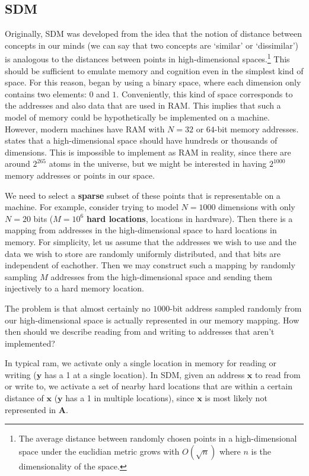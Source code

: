 \documentclass[journal, onecolumn, 12pt, draftclsnofoot]{IEEEtran}
\newcommand{\kword}[1]{\textbf{#1}}
\newcommand{\mbf}[1]{\mathbf{#1}}
\begin{document}
	\subsection{SDM}
	\par Originally, SDM was developed from the idea that the notion of distance between concepts in our minds (we can say that two concepts are `similar' or `dissimilar') is analogous to the distances between points in high-dimensional spaces.\footnote{The average distance between randomly chosen points in a high-dimensional space under the euclidian metric grows with $O(\sqrt{n})$ where $n$ is the dimensionality of the space.} This should be sufficient to emulate memory and cognition even in the simplest kind of space. For this reason, \cite{sdm} began by using a binary space, where each dimension only contains two elements: $0$ and $1$. Conveniently, this kind of space corresponds to the addresses and also data that are used in RAM. This implies that such a model of memory could be hypothetically be implemented on a machine. However, modern machines have RAM with $N = 32$ or $64$-bit memory addresses. \cite{sdm} states that a high-dimensional space should have hundreds or thousands of dimensions. This is impossible to implement as RAM in reality, since there are around $2^{265}$ atoms in the universe, but we might be interested in having $2^{1000}$ memory addresses or points in our space.
	\par We need to select a \kword{sparse} subset of these points that is representable on a machine. For example, consider trying to model $N = 1000$ dimensions with only $N=20$ bits ($M = 10^6$ \kword{hard locations}, locations in hardware). Then there is a mapping from addresses in the high-dimensional space to hard locations in memory. For simplicity, let us assume that the addresses we wish to use and the data we wish to store are randomly uniformly distributed, and that bits are independent of eachother. Then we may construct such a mapping by randomly sampling $M$ addresses from the high-dimensional space and sending them injectively to a hard memory location.
	\par The problem is that almost certainly no $1000$-bit address sampled randomly from our high-dimensional space is actually represented in our memory mapping. How then should we describe reading from and writing to addresses that aren't implemented?
	\par In typical ram, we activate only a single location in memory for reading or writing ($\mbf{y}$ has a 1 at a single location). In SDM, given an address $\mbf{x}$ to read from or write to, we activate a set of nearby hard locations that are within a certain distance of $\mbf{x}$ ($\mbf{y}$ has a 1 in multiple locations), since $\mbf{x}$ is most likely not represented in $\mbf{A}$.
\end{document}
